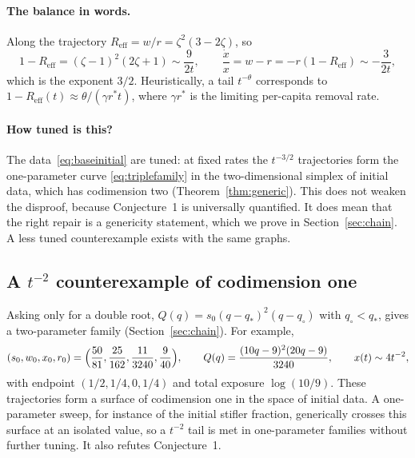 \documentclass[11pt,a4paper]{article}
\theoremstyle{definition}\newtheorem{definition}[theorem]{Definition}
\theoremstyle{remark}\newtheorem{remark}[theorem]{Remark}
\begin{document}
\paragraph{The balance in words.}
Along the trajectory
$R_{\mathrm{eff}}=w/r=\zeta^2(3-2\zeta)$, so
\[
1-R_{\mathrm{eff}}=(\zeta-1)^2(2\zeta+1)\sim\frac9{2t},\qquad
\frac{\dot x}x=w-r=-r(1-R_{\mathrm{eff}})\sim-\frac3{2t},
\]
which is the exponent $3/2$. Heuristically, a tail $t^{-\theta}$ corresponds
to $1-R_{\mathrm{eff}}(t)\approx\theta/(\gamma r^*t)$, where $\gamma r^*$
is the limiting per-capita removal rate.

\paragraph{How tuned is this?}
The data~\eqref{eq:baseinitial} are tuned: at fixed rates the
$t^{-3/2}$ trajectories form the one-parameter curve
\eqref{eq:triplefamily} in the two-dimensional simplex of initial data,
which has codimension two (Theorem~\ref{thm:generic}). This does not
weaken the disproof, because Conjecture~1 is universally quantified.
It does mean that the right repair is a genericity statement, which we
prove in Section~\ref{sec:chain}. A less tuned counterexample exists
with the same graphs.

\subsection{A \texorpdfstring{$t^{-2}$}{t^-2} counterexample of codimension one}
Asking only for a double root, $Q(q)=s_0(q-q_*)^2(q-q_\circ)$ with
$q_\circ<q_*$, gives a two-parameter family (Section~\ref{sec:chain}).
For example,
\begin{equation}
(s_0,w_0,x_0,r_0)=\Bigl(\frac{50}{81},\frac{25}{162},\frac{11}{3240},\frac9{40}\Bigr),
\qquad Q(q)=\frac{(10q-9)^2(20q-9)}{3240},
\qquad x(t)\sim4t^{-2},
\label{eq:doubleexample}
\end{equation}
with endpoint $(1/2,1/4,0,1/4)$ and total exposure $\log(10/9)$. These
trajectories form a surface of codimension one in the space of initial
data. A one-parameter sweep, for instance of the initial stifler
fraction, generically crosses this surface at an isolated value, so a
$t^{-2}$ tail is met in one-parameter families without further tuning.
It also refutes Conjecture~1.
\end{document}
